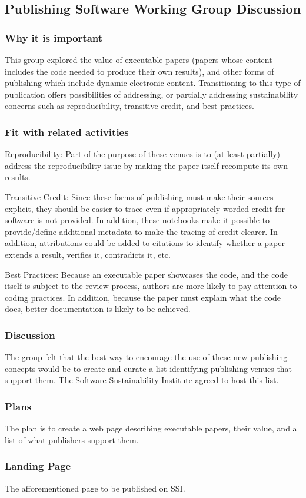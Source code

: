 \subsection{Publishing Software Working Group Discussion}

\subsubsection{Why it is important}

This group explored the value of executable papers (papers whose content includes
the code needed to produce their own results), and other forms of publishing which
include dynamic electronic content. Transitioning to this type of publication offers
possibilities of addressing, or partially addressing sustainability concerns 
such as reproducibility, transitive credit, and best practices.

\subsubsection{Fit with related activities}

Reproducibility: Part of the purpose of these venues is to (at least partially)
address the reproducibility issue by making the paper itself recompute its own
results.

Transitive Credit: Since these forms of publishing must make their sources explicit,
they should be easier to trace even if appropriately worded credit for software
is not provided. In addition, these notebooks make it possible to provide/define
additional metadata to make the tracing of credit clearer. In addition, attributions
could be added to citations to identify whether a paper extends a result, verifies it,
contradicts it, etc.

Best Practices: Because an executable paper showcases the code, and the code itself
is subject to the review process, authors are more likely to pay attention to coding
practices. In addition, because the paper must explain what the code does, better
documentation is likely to be achieved.

\subsubsection{Discussion}

The group felt that the best way to encourage the use of these new publishing
concepts would be to create and curate a list identifying publishing venues
that support them. The Software Sustainability Institute agreed to host this list.

\subsubsection{Plans}

The plan is to create a web page describing executable papers, their value, and
a list of what publishers support them.

\subsubsection{Landing Page}

The afforementioned page to be published on SSI.
